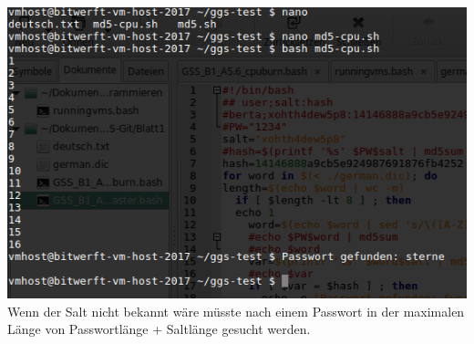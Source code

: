 \documentclass[ngerman]{fbi-aufgabenblatt}
\begin{document}
\includegraphics[scale=1]{Passwortgefunden.png} 
Wenn der Salt nicht bekannt wäre müsste nach einem Passwort in der maximalen Länge von Passwortlänge + Saltlänge gesucht werden.
\end{document}
